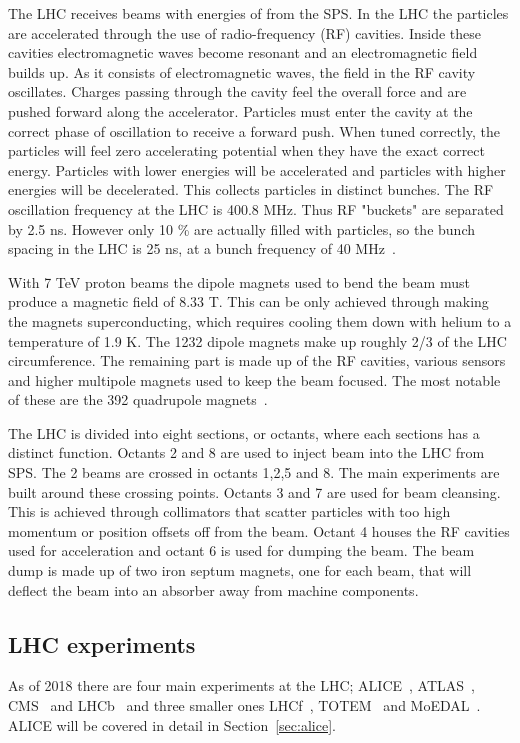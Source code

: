 The LHC receives beams with energies of \unit[450]{\gev} from the SPS. In the LHC the particles are accelerated through the use of radio-frequency (RF) cavities. Inside these cavities electromagnetic waves become resonant and an electromagnetic field builds up. As it consists of electromagnetic waves, the field in the RF cavity oscillates. Charges passing through the cavity feel the overall force and are pushed forward along the accelerator. Particles must enter the cavity at the correct phase of oscillation to receive a forward push. When tuned correctly, the particles will feel zero accelerating potential when they have the exact correct energy. Particles with lower energies will be accelerated and particles with higher energies will be decelerated. This collects particles in distinct bunches. The RF oscillation frequency at the LHC is 400.8 MHz. Thus  RF "buckets" are separated by 2.5 ns. However only 10 \% are actually filled with particles, so the bunch spacing in the LHC is 25 ns, at a bunch frequency of 40 MHz~\cite{Bruning:782076}.

With 7 TeV proton beams the dipole magnets used to bend the beam must produce a magnetic field of 8.33 T. This can be only achieved through making the magnets superconducting, which requires cooling them down with helium to a temperature of 1.9 K. The 1232 dipole magnets make up roughly 2/3 of the LHC circumference. The remaining part is made up of the RF cavities, various sensors and higher multipole magnets used to keep the beam focused. The most notable of these are the 392 quadrupole magnets~\cite{Bruning:782076}.

The LHC is divided into eight sections, or octants, where each sections has a distinct function. Octants 2 and 8 are used to inject beam into the LHC from SPS. The 2 beams are crossed in octants 1,2,5 and 8. The main experiments are built around these crossing points. Octants 3 and 7 are used for beam cleansing. This is achieved through collimators that scatter particles with too high momentum or position offsets off from the beam. Octant 4 houses the RF cavities used for acceleration and octant 6 is used for dumping the beam. The beam dump is made up of two iron septum magnets, one for each beam, that will deflect the beam into an absorber away from machine components. 


\subsection{LHC experiments}
As of 2018 there are four main experiments at the LHC; ALICE~\cite{aliceDetector}, ATLAS~\cite{Aad:2008zzm}, CMS~\cite{Chatrchyan:2008aa} and LHCb~\cite{Alves:2008zz} and three smaller ones LHCf~\cite{Adriani:2008zz}, TOTEM~\cite{Anelli:2008zza} and MoEDAL~\cite{MoEDAL:2016jlb}. ALICE will be covered in detail in Section~\ref{sec:alice}. 

